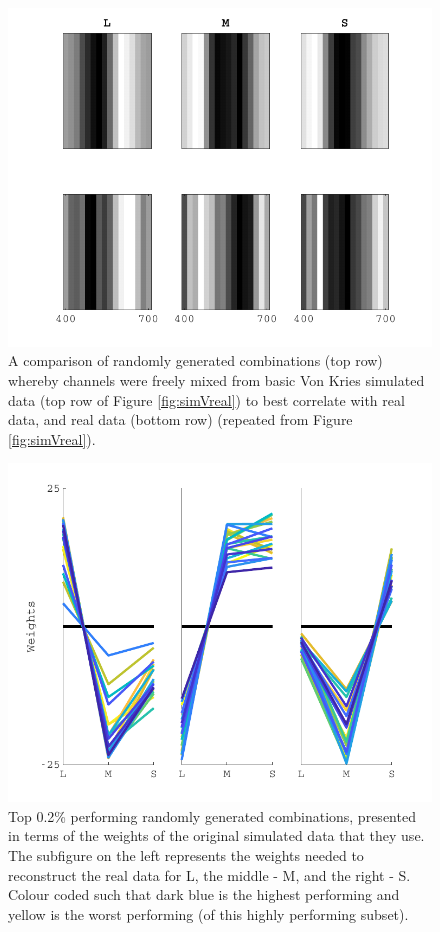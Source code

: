 \begin{figure}[htbp]
\includegraphics[max width=\textwidth]{figs/LargeSphere/maxsimVreal.pdf}
\caption{A comparison of randomly generated combinations (top row) whereby channels were freely mixed from basic Von Kries simulated data (top row of Figure \ref{fig:simVreal}) to best correlate with real data, and real data (bottom row) (repeated from Figure \ref{fig:simVreal}).}
\label{fig:maxsimVreal}
\end{figure}

\begin{figure}[htbp]
\includegraphics[max width=\textwidth]{figs/LargeSphere/contributions_3.pdf}
\caption{Top 0.2\% performing randomly generated combinations, presented in terms of the weights of the original simulated data that they use. The subfigure on the left represents the weights needed to reconstruct the real data for L, the middle - M, and the right - S. Colour coded such that dark blue is the highest performing and yellow is the worst performing (of this highly performing subset).}
\label{fig:contributions_3}
\end{figure}

